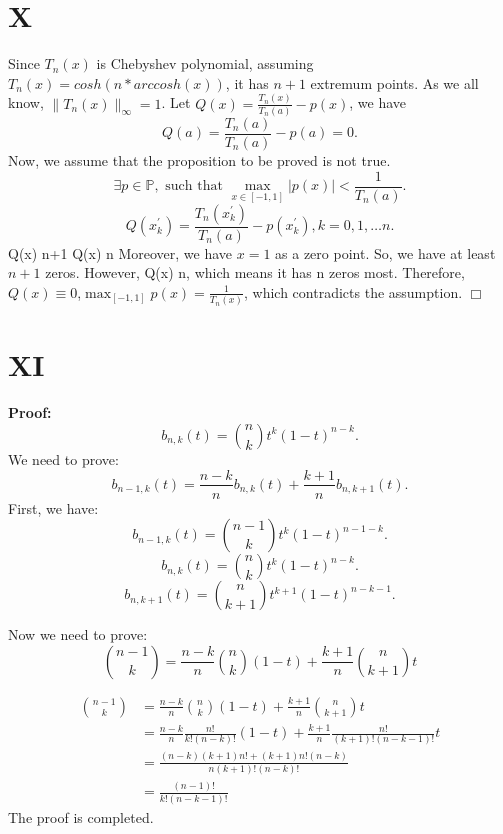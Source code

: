 \documentclass[a4paper]{article}
\begin{document}
\section*{X}
Since $T_n(x)$ is Chebyshev polynomial, assuming $T_n(x) = cosh(n*arccosh(x))$, it has $n+1$ extremum points.
As we all know, $\|T_n(x)\|_{\infty} = 1$.
Let $Q(x) = \frac{T_n(x)}{T_n(a)} - p(x)$, we have $$ Q(a) = \frac{T_n(a)}{T_n(a)} - p(a) = 0.$$
Now, we assume that the proposition to be proved is not true.
$$\exists p \in \mathbb{P},\text{ such that } \max_{x \in [-1,1]} |p(x)| < \frac{1}{T_n(a)}  .$$
$$Q(x_k^{'}) = \frac{T_n(x_k^{'})}{T_n(a)} - p(x_k^{'}), k = 0,1, \ldots n .$$
 Q(x)  n+1  Q(x)  n 
Moreover, we have $x = 1$ as a zero point. So, we have at least $n+1$ zeros. However,  Q(x)  n, which means it has n zeros most.
Therefore, $Q(x) \equiv  0$,$\max_{[-1,1]} p(x) = \frac{1}{T_n(x)}$, which contradicts the assumption.  \hfill $\Box$

\section*{XI}
\textbf{Proof:}
\[
b_{n,k}(t) = \binom{n}{k} t^k (1-t)^{n-k}.
\]
We need to prove:\[
b_{n-1,k}(t) = \frac{n-k}{n} b_{n,k}(t) + \frac{k+1}{n} b_{n,k+1}(t).
\]
First, we have:
\[
b_{n-1,k}(t) = \binom{n-1}{k} t^k (1-t)^{n-1-k}.
\]
\[
b_{n,k}(t) = \binom{n}{k} t^k (1-t)^{n-k}.
\]
\[
b_{n,k+1}(t) = \binom{n}{k+1} t^{k+1} (1-t)^{n-k-1}.
\]

Now we need to prove:
\[
  \binom{n-1}{k} = \frac{n-k}{n}\binom{n}{k}(1-t)+\frac{k+1}{n}\binom{n}{k+1}t
\]

\begin{align*}
  \binom{n-1}{k} &= \frac{n-k}{n}\binom{n}{k}(1-t)+\frac{k+1}{n}\binom{n}{k+1}t\\
  &=\frac{n-k}{n}\frac{n!}{k!(n-k)!}(1-t)+\frac{k+1}{n}\frac{n!}{(k+1)!(n-k-1)!}t\\
  &=\frac{(n-k)(k+1)n!+(k+1)n!(n-k)}{n(k+1)!(n-k)!}\\
  &=\frac{(n-1)!}{k!(n-k-1)!}
\end{align*}
The proof is completed.
\end{document}
